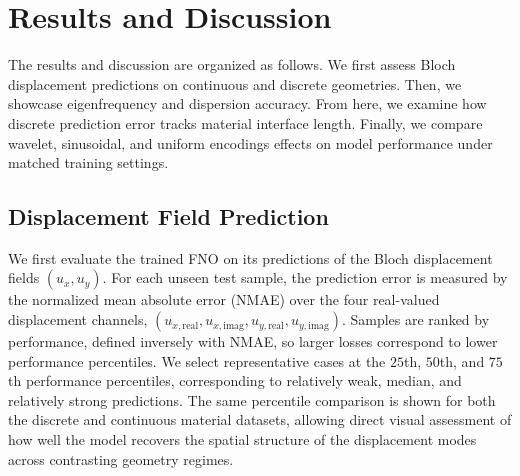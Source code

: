 \documentclass[preprint,review,12pt,numafflabel]{elsarticle}
\begin{document}


\section{Results and Discussion}


The results and discussion are organized as follows. We first assess Bloch displacement predictions on continuous and discrete geometries. Then, we showcase eigenfrequency and dispersion accuracy. From here, we examine how discrete prediction error tracks material interface length. Finally, we compare wavelet, sinusoidal, and uniform encodings effects on model performance under matched training settings.

\subsection{Displacement Field Prediction}
We first evaluate the trained FNO on its predictions of the Bloch displacement fields $(u_x,u_y)$. For each unseen test sample, the prediction error is measured by the normalized mean absolute error (NMAE) over the four real-valued displacement channels, $(u_{x,\mathrm{real}},u_{x,\mathrm{imag}},u_{y,\mathrm{real}},u_{y,\mathrm{imag}})$. Samples are ranked by performance, defined inversely with NMAE, so larger losses correspond to lower performance percentiles. We select representative cases at the $25$th, $50$th, and $75$th performance percentiles, corresponding to relatively weak, median, and relatively strong predictions. The same percentile comparison is shown for both the discrete and continuous material datasets, allowing direct visual assessment of how well the model recovers the spatial structure of the displacement modes across contrasting geometry regimes.
\end{document}
